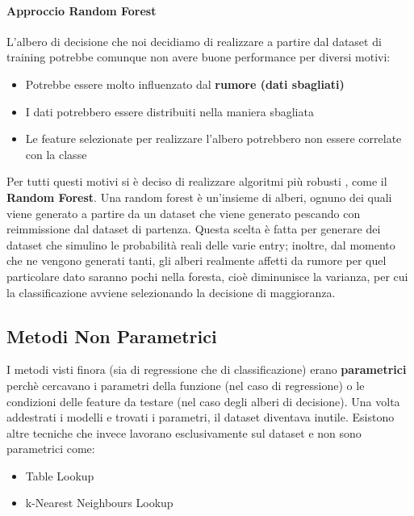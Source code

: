 \paragraph{Approccio Random Forest}
L'albero di decisione che noi decidiamo di realizzare a partire dal dataset di training potrebbe comunque
non avere buone performance per diversi motivi:
\begin{itemize}
    \item Potrebbe essere molto influenzato dal \textbf{rumore (dati sbagliati)}
    \item I dati potrebbero essere distribuiti nella maniera sbagliata
    \item Le feature selezionate per realizzare l'albero potrebbero non essere correlate con la classe
\end{itemize}
Per tutti questi motivi si è deciso di realizzare algoritmi più robusti , come il \textbf{Random Forest}.
Una random forest è un'insieme di alberi, ognuno dei quali viene generato a partire da un dataset che viene
generato pescando con reimmissione dal dataset di partenza. Questa scelta è fatta per generare dei dataset
che simulino le probabilità reali delle varie entry; inoltre, dal momento che ne vengono generati tanti,
gli alberi realmente affetti da rumore per quel particolare dato saranno pochi nella foresta, cioè diminunisce 
la varianza, per cui la classificazione avviene selezionando la decisione di maggioranza.

\subsection{Metodi Non Parametrici}
I metodi visti finora (sia di regressione che di classificazione) erano \textbf{parametrici} perchè cercavano
i parametri della funzione (nel caso di regressione) o le condizioni delle feature da testare 
(nel caso degli alberi di decisione). Una volta addestrati i modelli e trovati i parametri, il dataset diventava
inutile. Esistono altre tecniche che invece lavorano esclusivamente sul dataset e non sono parametrici come:
\begin{itemize}
    \item Table Lookup
    \item k-Nearest Neighbours Lookup
\end{itemize}

